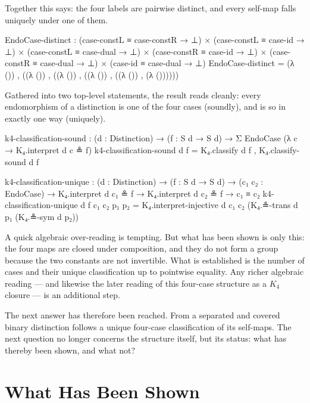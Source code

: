 \documentclass[11pt,a4paper]{book}
\begin{document}
Together this says: the four labels are pairwise distinct, and every
self-map falls uniquely under one of them.

\begin{code}
EndoCase-distinct :
  (case-constL ≡ case-constR → ⊥) ×
  (case-constL ≡ case-id     → ⊥) ×
  (case-constL ≡ case-dual   → ⊥) ×
  (case-constR ≡ case-id     → ⊥) ×
  (case-constR ≡ case-dual   → ⊥) ×
  (case-id     ≡ case-dual   → ⊥)
EndoCase-distinct =
  (λ ()) ,
  ((λ ()) ,
   ((λ ()) ,
    ((λ ()) ,
     ((λ ()) ,
      (λ ())))))
\end{code}

Gathered into two top-level statements, the result reads cleanly: every
endomorphism of a distinction is one of the four cases (soundly), and is
so in exactly one way (uniquely).

\begin{code}
k4-classification-sound :
  (d : Distinction) →
  (f : S d → S d) →
  Σ EndoCase (λ c → K₄.interpret d c ≗ f)
k4-classification-sound d f = K₄.classify d f , K₄.classify-sound d f

k4-classification-unique :
  (d : Distinction) →
  (f : S d → S d) →
  (c₁ c₂ : EndoCase) →
  K₄.interpret d c₁ ≗ f →
  K₄.interpret d c₂ ≗ f →
  c₁ ≡ c₂
k4-classification-unique d f c₁ c₂ p₁ p₂ =
  K₄.interpret-injective d c₁ c₂ (K₄.≗-trans d p₁ (K₄.≗-sym d p₂))
\end{code}

A quick algebraic over-reading is tempting. But what has been shown is only
this: the four maps are closed under composition, and they do not form a
group because the two constants are not invertible. What is established is
the number of cases and their unique classification up to pointwise
equality. Any richer algebraic reading --- and likewise the later reading
of this four-case structure as a $K_4$ closure --- is an additional step.

The next answer has therefore been reached. From a separated and covered
binary distinction follows a unique four-case classification of its
self-maps. The next question no longer concerns the structure itself, but
its status: what has thereby been shown, and what not?

\chapter{What Has Been Shown}
\label{ch:reading-the-threshold}
\label{ch:toward-form}
\label{ch:conclusion}
\end{document}
